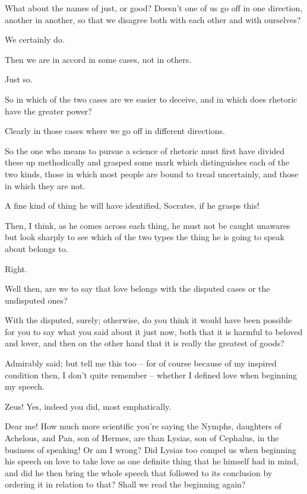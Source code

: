 What about the names of just, or
good? Doesn't one of us
go off in one direction, another in another, so that  we
disagree both with each other and with ourselves?

We certainly do.

Then we are in accord in some cases, not in others. 

Just so.

So in which of the two cases are we easier to deceive, and in
which does rhetoric have the greater power?

Clearly in those cases where we go off in different 
directions.

So the one who means to pursue a science of rhetoric must first
have divided these up methodically and grasped some mark which
distinguishes each of the two kinds, those in which most
people are bound to
tread uncertainly, and those in which they are not.

A fine kind of thing he will have identified, Socrates,
 if he grasps this!

Then, I think, as he comes across each thing, he must not be
caught unawares but look sharply to see which of the two types the thing
he is going to speak about belongs to. 

Right.

Well then, are we to say that love belongs with the disputed
cases or the undisputed ones?

With the disputed, surely; otherwise, do you think it would
have been possible for you to say what you said about  it just
now, both that it is harmful to beloved and lover, and then on the other
hand that it is really the greatest of goods?

Admirably said; but tell me this too -- for of course 
because of my inspired condition then, I don't quite remember -- whether
I defined love when beginning my speech.

Zeus! Yes, indeed you did, most emphatically.

Dear me! How much more scientific you're saying  the
Nymphs, daughters of Achelous, and Pan, son of Hermes, are than Lysias,
son of Cephalus, in the business of speaking! Or am I wrong? Did Lysias
too compel us when beginning his speech on love to take love as one
definite thing that he himself  had in mind, and did he then
bring the whole speech that followed to its conclusion by ordering it in
relation to that? Shall we read the beginning again?

